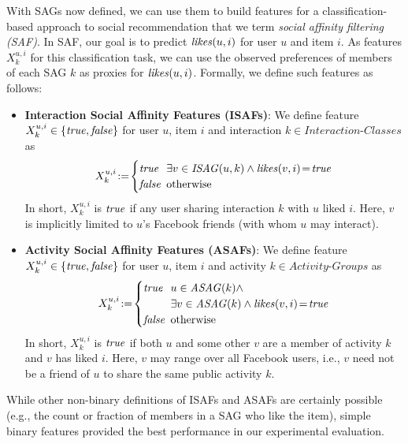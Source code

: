 \label{ssec:SAfeature}

With SAGs now defined, we can use them to build features for a
classification-based approach to social recommendation that we term
\emph{social affinity filtering (SAF)}.  In SAF, our goal is to
predict $\like(u,i)$ for user $u$ and item $i$.  As features
$X^{u,i}_k$ for this classification task, we can use the observed
preferences of members of each SAG $k$ as proxies for $\like(u,i)$.
Formally, we define such features as follows:

\begin{itemize} 
\item \textbf{Interaction Social Affinity Features (ISAFs)}: 
We define feature $X^{u,i}_k \in \{ \true, \false \}$ for user $u$, item $i$ and interaction
$k \in \textit{Interaction-Classes}$ as
  \begin{equation*}
   X^{u,i}_{k} \! := \!
      \begin{cases}
   		\true  \!\!\! & \exists v \in \mathit{ISAG}(u,k) \wedge \likes(v,i)\!=\!\true\\ 
   		\false \!\!\! & \text{otherwise}
      \end{cases}
  \end{equation*}
   In short, $X^{u,i}_{k}$ is $\true$ if any user sharing interaction $k$ with $u$ liked $i$.
   Here, $v$ is implicitly limited to $u$'s Facebook friends (with whom $u$
   may interact).
\item \textbf{Activity Social Affinity Features (ASAFs)}: 
We define feature $X^{u,i}_k \in \{ \true, \false \}$ for user $u$, item $i$ and activity
$k \in \textit{Activity-Groups}$ as
  \begin{equation*}
   X^{u,i}_{k} \! := \! 
      \begin{cases}
   		\true  \!\!\! & u \in \mathit{ASAG}(k) \wedge \\
                              & \exists v \in \mathit{ASAG}(k) \wedge \likes(v,i)\!=\!\true\\
   		\false \!\!\! & \text{otherwise}
      \end{cases}
  \end{equation*}
  In short, $X^{u,i}_{k}$ is $\true$ if both $u$ and some other $v$ are a member of activity $k$
  and $v$ has liked $i$.  Here, $v$ may range over all Facebook users, 
  i.e., $v$ need not be a friend of $u$ to share the same public activity $k$.
\end{itemize}

While other non-binary definitions of ISAFs and ASAFs are certainly
possible (e.g., the count or fraction of members in a SAG who like the
item), simple binary features provided the best performance in our
experimental evaluation.

